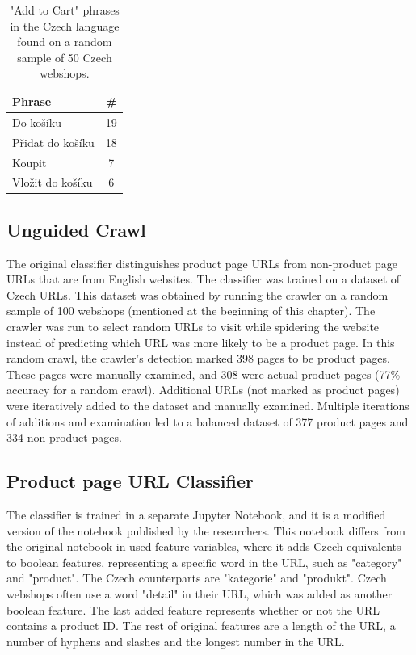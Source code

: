         \begin{table}[h!]
            \bgroup
            \def\arraystretch{1.65}
            \centering
            \begin{tabular}{l | c} 
                \toprule
                \textbf{Phrase} & \textbf{\#} \\ [0.5ex] 
                \hline
                Do košíku & 19 \\ \hline
                Přidat do košíku & 18 \\ \hline
                Koupit & 7 \\ \hline
                Vložit do košíku & 6 \\ [1ex] 
            \end{tabular}
            \egroup
            \caption{"Add to Cart" phrases in the Czech language found on a random sample of 50 Czech webshops.}
            \label{table:add-to-cart-phrases}
        \end{table}

        \subsection{Unguided Crawl}

        The original classifier distinguishes product page URLs from non-product page URLs that are from English websites. The classifier was trained on a dataset of Czech URLs. This dataset was obtained by running the crawler on a random sample of 100 webshops (mentioned at the beginning of this chapter). The crawler was run to select random URLs to visit while spidering the website instead of predicting which URL was more likely to be a product page. In this random crawl, the crawler's detection marked 398 pages to be product pages. These pages were manually examined, and 308 were actual product pages (77\% accuracy for a random crawl). Additional URLs (not marked as product pages) were iteratively added to the dataset and manually examined. Multiple iterations of additions and examination led to a balanced dataset of 377 product pages and 334 non-product pages.

        \subsection{Product page URL Classifier}

        The classifier is trained in a separate Jupyter Notebook, and it is a modified version of the notebook published by the researchers. This notebook differs from the original notebook in used feature variables, where it adds Czech equivalents to boolean features, representing a specific word in the URL, such as "category" and "product". The Czech counterparts are "kategorie" and "produkt". Czech webshops often use a word "detail" in their URL, which was added as another boolean feature. The last added feature represents whether or not the URL contains a product ID. The rest of original features are a length of the URL, a number of hyphens and slashes and the longest number in the URL. 


